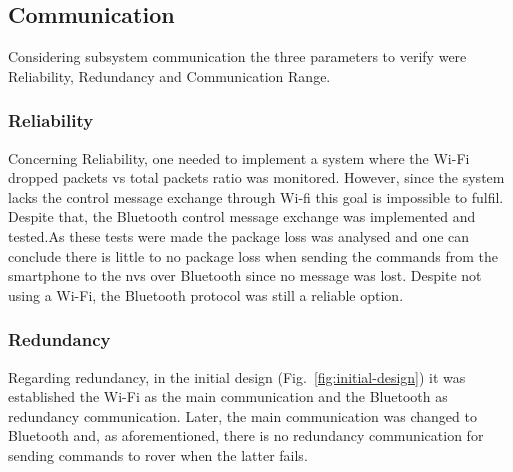 \subsection{Communication}%
\label{comm-verif}
Considering subsystem communication the three parameters to verify were
Reliability, Redundancy and Communication Range.
%
\subsubsection{Reliability}%
\label{comm-verif-reliability}
Concerning Reliability, one needed to implement a system where the Wi-Fi dropped packets vs total packets ratio was monitored. However, since the system lacks the control message exchange through Wi-fi this goal is impossible to fulfil. Despite that, the Bluetooth control message exchange was implemented and tested.As these tests were made the package loss was analysed and one can conclude there is little to no package loss when sending the commands from the smartphone to the \gls{nvs} over Bluetooth since no message was lost. Despite not using a Wi-Fi, the Bluetooth protocol was still a reliable option.
%
\subsubsection{Redundancy}%
\label{comm-verif-redundancy}
Regarding redundancy, in the initial design (Fig.~\ref{fig:initial-design}) it was established the Wi-Fi as the main communication and the Bluetooth as redundancy communication. Later, the main communication was changed to Bluetooth and, as aforementioned, there is no redundancy communication for sending commands to rover when the latter fails.
%
